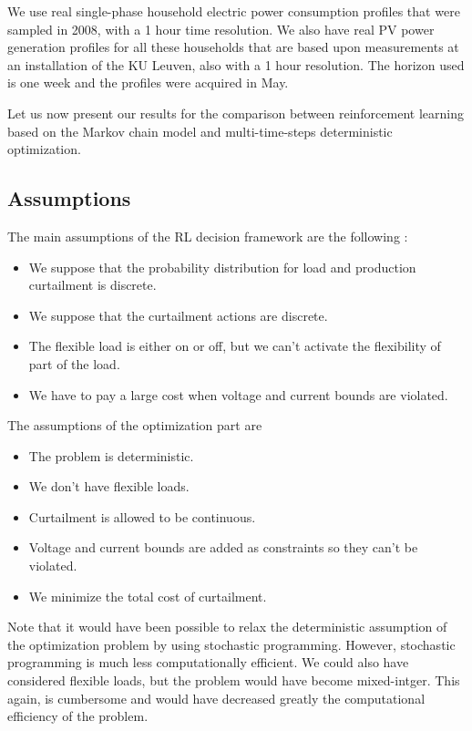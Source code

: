 We use real single-phase household electric power consumption profiles
that were sampled in 2008, with a 1 hour time resolution.
We also have real PV power generation profiles for all these households that are based upon measurements at an installation of the KU Leuven, also with a 1 hour resolution.
The horizon used is one week and the profiles were acquired in May.

Let us now present our results for the comparison between reinforcement learning based on the Markov chain model and multi-time-steps deterministic optimization.

\subsection{Assumptions}

The main assumptions of the RL decision framework are the following :
\begin{itemize}
\item We suppose that the probability distribution for load and production curtailment is discrete.
\item We suppose that the curtailment actions are discrete.
\item The flexible load is either on or off, but we can't activate the flexibility of part of the load.
\item We have to pay a large cost when voltage and current bounds are violated.
\end{itemize}

The assumptions of the optimization part are
\begin{itemize}
\item The problem is deterministic.
\item We don't have flexible loads.
\item Curtailment is allowed to be continuous.
\item Voltage and current bounds are added as constraints so they can't be violated.
\item We minimize the total cost of curtailment.
\end{itemize}

Note that it would have been possible to relax the deterministic assumption of the optimization problem by using stochastic programming.
However, stochastic programming is much less computationally efficient.
We could also have considered flexible loads, but the problem would have become mixed-intger.
This again, is cumbersome and would have decreased greatly the computational efficiency of the problem.

